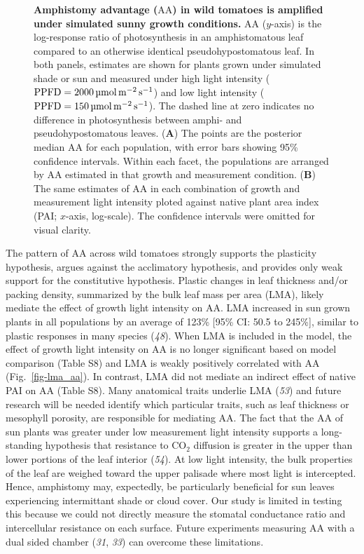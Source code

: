 \documentclass[
  letterpaper,
  DIV=11,
  numbers=noendperiod]{scrartcl}
\newcommand{\aax}{$\mathrm{AA}$}
\newcommand{\ppfdequals}[1]{$\mathrm{PPFD} = \qty{#1}{\micro\mol\raiseto{-2}\meter\raiseto{-1}\second}$}
\begin{document}
\begin{figure}


\caption{\label{fig-aacap}\textbf{Amphistomy advantage (\aax{}) in wild tomatoes is amplified under simulated sunny growth conditions.}
\aax{} (\(y\)-axis) is the log-response ratio of photosynthesis in an
amphistomatous leaf compared to an otherwise identical
pseudohypostomatous leaf. In both panels, estimates are shown for plants
grown under simulated shade or sun and measured under high light
intensity (\ppfdequals{2000}) and low light intensity
(\ppfdequals{150}). The dashed line at zero indicates no difference in
photosynthesis between amphi- and pseudohypostomatous leaves.
(\textbf{A}) The points are the posterior median \aax{} for each
population, with error bars showing 95\% confidence intervals. Within
each facet, the populations are arranged by \aax{} estimated in that
growth and measurement condition. (\textbf{B}) The same estimates of
\aax{} in each combination of growth and measurement light intensity
ploted against native plant area index (PAI; \(x\)-axis, log-scale). The
confidence intervals were omitted for visual clarity.}

\end{figure}%

The pattern of \aax{} across wild tomatoes strongly supports the
plasticity hypothesis, argues against the acclimatory hypothesis, and
provides only weak support for the constitutive hypothesis. Plastic
changes in leaf thickness and/or packing density, summarized by the bulk
leaf mass per area (LMA), likely mediate the effect of growth light
intensity on \aax{}. LMA increased in sun grown plants in all
populations by an average of 123\% {[}95\% CI: 50.5 to 245\%{]}, similar
to plastic responses in many species (\emph{48}). When LMA is included
in the model, the effect of growth light intensity on \aax{} is no
longer significant based on model comparison (Table S8) and LMA is
weakly positively correlated with \aax{} (Fig.~\ref{fig-lma_aa}). In
contrast, LMA did not mediate an indirect effect of native PAI on \aax{}
(Table S8). Many anatomical traits underlie LMA (\emph{53}) and future
research will be needed identify which particular traits, such as leaf
thickness or mesophyll porosity, are responsible for mediating \aax{}.
The fact that the \aax{} of sun plants was greater under low measurement
light intensity supports a long-standing hypothesis that resistance to
CO\(_2\) diffusion is greater in the upper than lower portions of the
leaf interior (\emph{54}). At low light intensity, the bulk properties
of the leaf are weighed toward the upper palisade where most light is
intercepted. Hence, amphistomy may, expectedly, be particularly
beneficial for sun leaves experiencing intermittant shade or cloud
cover. Our study is limited in testing this because we could not
directly measure the stomatal conductance ratio and intercellular
resistance on each surface. Future experiments measuring \aax{} with a
dual sided chamber (\emph{31}, \emph{33}) can overcome these
limitations.
\end{document}
